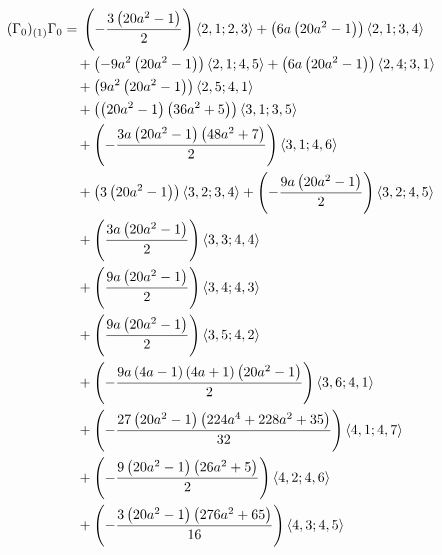 \begin{align*}
(\Gamma_0)_{(1)}\Gamma_0 &={} \left(- \frac{3 \left(20 a^{2} - 1\right)}{2}\right)\langle 2,1;2,3\rangle + \left(6 a \left(20 a^{2} - 1\right)\right)\langle 2,1;3,4\rangle\\
&\quad {}+ \left(- 9 a^{2} \left(20 a^{2} - 1\right)\right)\langle 2,1;4,5\rangle + \left(6 a \left(20 a^{2} - 1\right)\right)\langle 2,4;3,1\rangle\\
&\quad {}+ \left(9 a^{2} \left(20 a^{2} - 1\right)\right)\langle 2,5;4,1\rangle\\
&\quad {}+ \left(\left(20 a^{2} - 1\right) \left(36 a^{2} + 5\right)\right)\langle 3,1;3,5\rangle\\
&\quad {}+ \left(- \frac{3 a \left(20 a^{2} - 1\right) \left(48 a^{2} + 7\right)}{2}\right)\langle 3,1;4,6\rangle\\
&\quad {}+ \left(3 \left(20 a^{2} - 1\right)\right)\langle 3,2;3,4\rangle + \left(- \frac{9 a \left(20 a^{2} - 1\right)}{2}\right)\langle 3,2;4,5\rangle\\
&\quad {}+ \left(\frac{3 a \left(20 a^{2} - 1\right)}{2}\right)\langle 3,3;4,4\rangle\\
&\quad {}+ \left(\frac{9 a \left(20 a^{2} - 1\right)}{2}\right)\langle 3,4;4,3\rangle\\
&\quad {}+ \left(\frac{9 a \left(20 a^{2} - 1\right)}{2}\right)\langle 3,5;4,2\rangle\\
&\quad {}+ \left(- \frac{9 a \left(4 a - 1\right) \left(4 a + 1\right) \left(20 a^{2} - 1\right)}{2}\right)\langle 3,6;4,1\rangle\\
&\quad {}+ \left(- \frac{27 \left(20 a^{2} - 1\right) \left(224 a^{4} + 228 a^{2} + 35\right)}{32}\right)\langle 4,1;4,7\rangle\\
&\quad {}+ \left(- \frac{9 \left(20 a^{2} - 1\right) \left(26 a^{2} + 5\right)}{2}\right)\langle 4,2;4,6\rangle\\
&\quad {}+ \left(- \frac{3 \left(20 a^{2} - 1\right) \left(276 a^{2} + 65\right)}{16}\right)\langle 4,3;4,5\rangle
\end{align*}
